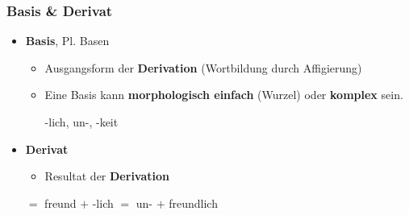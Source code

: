 \begin{frame}
\frametitle{Basis \& Derivat}

\begin{itemize}
	\item \textbf{Basis}, Pl. Basen \citep[vgl.][]{Eins16a}
	
	\begin{itemize}
		\item Ausgangsform der \textbf{Derivation} (Wortbildung durch Affigierung)
		\item Eine Basis kann \textbf{morphologisch einfach} (Wurzel) oder \textbf{komplex} sein.
		
		\ea {}-lich, un-, -keit
		\z 

	\end{itemize}

	\item \textbf{Derivat}
	\begin{itemize}
		\item Resultat der \textbf{Derivation}
	\end{itemize}
	
	\ea 
		\ea {} $=$ freund $+$ -lich
		\ex {} $=$ un- $+$ freundlich
		\z 
	\z 

\end{itemize}

\end{frame}


